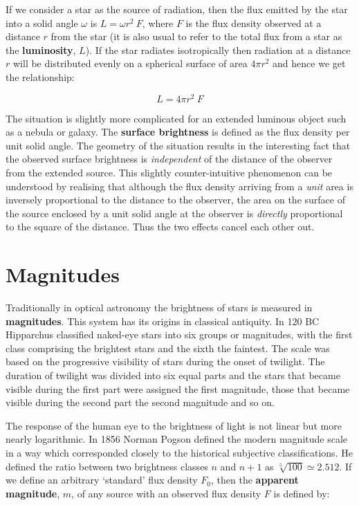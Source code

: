 \documentclass[twoside,11pt,nolof]{starlink}
\begin{document}
If we consider a star as the source of radiation, then the flux
emitted by the star into a solid angle $\omega$ is $L=\omega r^2~F$,
where $F$ is the flux density observed at a distance $r$ from the
star (it is also usual to refer to the total flux from a star as the \textbf{luminosity}, $L$). If the star radiates isotropically then
radiation at a distance $r$ will be distributed evenly on a spherical
surface of area $4\pi r^2$ and hence we get the relationship:

\begin{equation}
L = 4 \pi r^2~F
\end{equation}

The situation is slightly more complicated for an extended luminous
object such as a nebula or galaxy. The \textbf{surface brightness} is
defined as the flux density per unit solid angle. The geometry of the
situation results in the interesting fact that the observed surface
brightness is \textit{independent} of the distance of the observer from
the extended source. This slightly counter-intuitive phenomenon can be
understood by realising that although the flux density arriving from a
\textit{unit} area is inversely proportional to the distance to the observer,
the area on the surface of the source enclosed by a unit solid angle at
the observer is \textit{directly} proportional to the square of the
distance. Thus the two effects cancel each other out.


\section{\label{MAGNITUDES}Magnitudes}

Traditionally in optical astronomy the brightness of stars is measured
in \textbf{magnitudes}.  This system has its origins in classical
antiquity.  In 120 BC Hipparchus classified naked-eye stars into
six groups or magnitudes, with the first class comprising the brightest
stars and the sixth the faintest.  The scale was based on the
progressive visibility of stars during the onset of twilight.  The
duration of twilight was divided into six equal parts and the stars that
became visible during the first part were assigned the first magnitude,
those that became visible during the second part the second magnitude
and so on.

The response of the human eye to the brightness of light is not linear
but more nearly logarithmic. In 1856 Norman Pogson defined the modern
magnitude scale in a way which corresponded closely to the historical
subjective classifications.  He defined the ratio between two brightness
classes $n$ and $n+1$ as $\sqrt[5]{100} \simeq 2.512$.  If we define an
arbitrary `standard' flux density $F_0$, then the \textbf{apparent
magnitude}, $m$, of any source with an observed flux density $F$ is
defined by:
\end{document}
